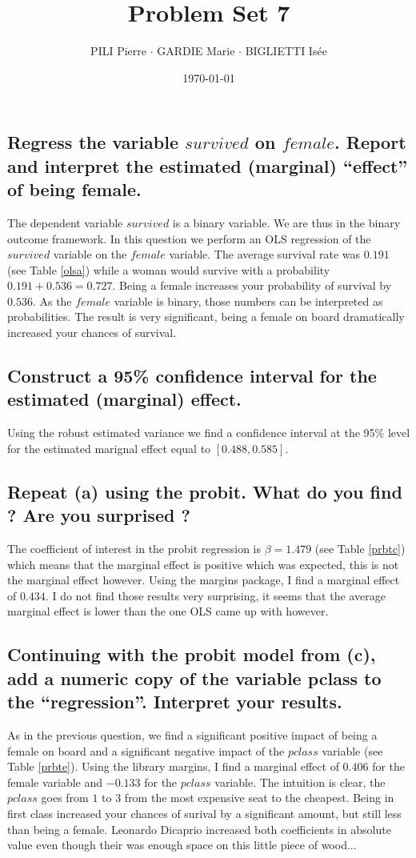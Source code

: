 \documentclass[12pt]{article}
\title{Problem Set 7}
\author{PILI Pierre $\cdot$ GARDIE Marie $\cdot$ BIGLIETTI Isée}
\date{\today}
\renewcommand{\thesubsection}{\arabic{section}.\arabic{subsection}}
\begin{document}
\maketitle
\renewcommand{\thesubsection}{\alph{subsection}}

\subsection{Regress the variable $survived$ on $female$. Report and interpret the estimated (marginal) “effect” of being female.}

The dependent variable $survived$ is a binary variable. We are thus in the binary outcome framework. In this question we perform an OLS regression of the $survived$
variable on the $female$ variable. The average survival rate was $0.191$ (see Table \ref{olsa}) while a woman would survive with a probability $0.191 + 0.536 = 0.727$.
Being a female increases your probability of survival by $0.536$. As the $female$ variable is binary, those numbers can be interpreted as probabilities. The result is very significant, being a female on board dramatically increased your chances of survival.
\subsection{Construct a 95\% confidence interval for the estimated (marginal) effect.}
Using the robust estimated variance we find a confidence interval at the 95\% level for the estimated marignal effect equal to $[0.488, 0.585]$.
\subsection{Repeat (a) using the probit. What do you find ? Are you surprised ?}

The coefficient of interest in the probit regression is $\beta = 1.479$ (see Table \ref{prbtc}) which means that the marginal effect is positive which was expected, this is not the marginal effect however. Using the margins package, I find a marginal effect of $0.434$. I do not find those results very surprising, it seems that the average marginal effect is lower than the one OLS came up with however. 
\subsection{Continuing with the probit model from (c), add a numeric copy of the variable pclass to the “regression”. Interpret your results.}
As in the previous question, we find a significant positive impact of being a female on board and a significant negative impact of the $pclass$ variable (see Table \ref{prbte}). Using the library margins, I find a marginal effect of $0.406$ for the female variable and $-0.133$ for the $pclass$ variable. The intuition is clear, the $pclass$ goes from $1$ to $3$ from the most expensive seat to the cheapest. Being in first class increased your chances of surival by a significant amount, but still less than being a female. Leonardo Dicaprio increased both coefficients in absolute value even though their was enough space on this little piece of wood...

\end{document}
